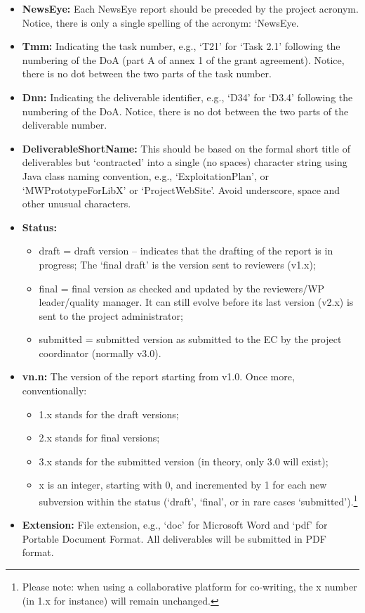 \documentclass{newseye_del}
\begin{document}
\begin{itemize}
    \item \textbf{NewsEye:} Each NewsEye report should be preceded by the
      project acronym. Notice, there is only a single spelling of the acronym:
      `NewsEye.
    \item \textbf{Tmm:} Indicating the task number, e.g., `T21' for `Task 2.1'
      following the numbering of the DoA (part A of annex 1 of the grant
      agreement). Notice, there is no dot between the two parts of the task number.
    \item \textbf{Dnn:} Indicating the deliverable identifier, e.g., `D34' for
      `D3.4' following the numbering of the DoA.
      Notice, there is no dot between the two parts of the deliverable number.
    \item \textbf{DeliverableShortName:} This should be based on the formal
      short title of deliverables but `contracted' into a single (no spaces)
      character string using Java class naming convention, e.g., `ExploitationPlan',
      or `MWPrototypeForLibX' or `ProjectWebSite'.
      Avoid underscore, space and other unusual characters.
    \item \textbf{Status:}
      \begin{itemize}
          \item draft = draft version -- indicates that the drafting of the
            report is in progress; The `final draft' is the version sent to reviewers (v1.x);
          \item final = final version as checked and updated by the
            reviewers/WP leader/quality manager.
            It can still evolve before its last version (v2.x) is sent to the
            project administrator;
          \item submitted = submitted version as submitted to the EC by the
            project coordinator (normally v3.0).
      \end{itemize}
    \item \textbf{vn.n:} The version of the report starting from v1.0.
      Once more, conventionally:
      \begin{itemize}
          \item 1.x stands for the draft versions;
          \item 2.x stands for final versions;
          \item 3.x stands for the submitted version (in theory, only 3.0 will exist);
          \item x is an integer, starting with 0, and incremented by 1 for
            each new subversion within the status (`draft', `final', or in rare
            cases `submitted').\footnote{%
              Please note: when using a collaborative platform for co-writing,
              the x number (in 1.x for instance) will remain unchanged.}
      \end{itemize}
    \item \textbf{Extension:} File extension, e.g., `doc' for Microsoft Word
      and `pdf' for Portable Document Format. All deliverables will be
      submitted in PDF format.
\end{itemize}
\end{document}
